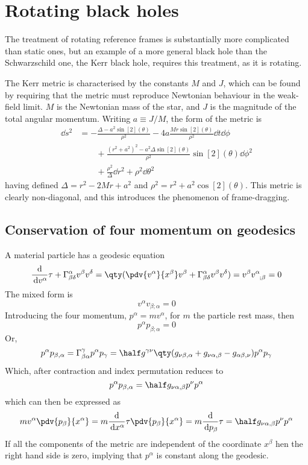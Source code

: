 \section{Rotating black holes}
\label{sec:rotating-black-holes}

The treatment of rotating reference frames is substantially more
complicated than static ones, but an example of a more general black
hole than the Schwarzschild one, the Kerr black hole, requires this
treatment, as it is rotating.

The Kerr metric is characterised by the constants $M$ and $J$, which
can be found by requiring that the metric must reproduce Newtonian
behaviour in the weak-field limit. $M$ is the Newtonian mass of the
star, and $J$ is the magnitude of the total angular momentum. Writing
$a \equiv J/M$, the form of the metric is
\begin{align}
  \dd{s}^2 &= - \frac{\Delta - a^2 \sin[2](\theta)}{\rho^2} - 4a \frac{Mr \sin[2](\theta)}{\rho^2} \dd{t} \dd{\phi} \nonumber\\
 & \qquad {}+ \frac{(r^2+a^2)^2 -a^2 \Delta \sin[2](\theta)}{\rho^2} \sin[2](\theta) \dd{\phi}^2 \nonumber\\
& \qquad {}+ \frac{\rho^2}{\Delta} \dd{r}^2 + \rho^2 \dd{\theta}^2
\end{align}
having defined $\Delta = r^2 - 2Mr + a^2$ and $\rho^2 = r^2 + a^2
\cos[2](\theta)$. This metric is clearly non-diagonal, and this
introduces the phenomenon of frame-dragging.

\subsection{Conservation of four momentum on geodesics}
\label{sec:cons-four-moment}

A material particle has a geodesic equation 
\[ \dv{v^{\alpha}}{\tau} + \Gamma^{\alpha}_{\beta \delta} v^{\beta} v^{\delta} = \qty( \pdv{v^{\alpha}}{x^{\beta}} v^{\beta} + \Gamma^{\alpha}_{\beta \delta} v^{\beta} v^{\delta} ) = v^{\beta} \tensor{v}{^{\alpha}_{;\beta}} = 0 \]
The mixed form is
\[ v^{\alpha} v_{\beta;\alpha} = 0 \] Introducing the four momentum,
$p^{\alpha} = m v^{\alpha}$, for $m$ the particle rest mass, then
\begin{equation}
  \label{eq:238}
  p^{\alpha} p_{\beta;\alpha} = 0
\end{equation}
Or,
\[ p^{\alpha}p_{\beta,\alpha} = \Gamma^{\gamma}_{\beta \alpha} p^{\alpha} p_{\gamma} = \half g^{\gamma \nu} \qty( g_{\nu \beta,\alpha} + g_{\nu \alpha, \beta} - g_{\alpha \beta, \nu}) p^{\alpha} p_{\gamma} \]
Which, after contraction and index permutation reduces to
\[ p^{\alpha} p_{\beta,\alpha} = \half g_{\nu \alpha, \beta} p^{\nu} p^{\alpha} \]
which can then be expressed as
\begin{equation}
  \label{eq:239}
  m v^{\alpha} \pdv{p_{\beta}}{x^{\alpha}} = m \dv{x^{\alpha}}{\tau} \pdv{p_{\beta}}{x^{\alpha}} = m \dv{p_{\beta}}{\tau} = \half g_{\nu \alpha,\beta} p^{\nu} p^{\alpha}
\end{equation}
If all the components of the metric are independent of the coordinate
$x^{\beta}$ hen the right hand side is zero, implying that
$p^{\alpha}$ is constant along the geodesic.

